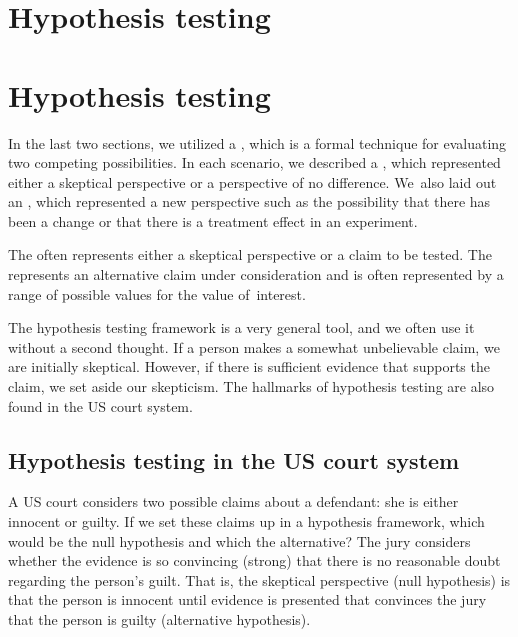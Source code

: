 \section{Hypothesis testing}

\section{Hypothesis testing}
\label{HypothesisTesting}

In the last two sections, we utilized a , which is a formal technique for evaluating two competing possibilities. In each scenario, we described a , which represented either a skeptical perspective or a perspective of no difference. We~also laid out an , which represented a new perspective such as the possibility that there has been a change or that there is a treatment effect in an experiment.

\begin{termBox}{
The  often represents either a skeptical perspective or a claim to be tested. The  represents an alternative claim under consideration and is often represented by a range of possible values for the value of~interest.}
\end{termBox}

The hypothesis testing framework is a very general tool, and we often use it without a second thought. If a person makes a somewhat unbelievable claim, we are initially skeptical. However, if there is sufficient evidence that supports the claim, we set aside our skepticism. The hallmarks of hypothesis testing are also found in the US court system. 

\subsection{Hypothesis testing in the US court system}

\begin{example}{A US court considers two possible claims about a defendant: she is either innocent or guilty. If we set these claims up in a hypothesis framework, which would be the null hypothesis and which the alternative?}\label{hypTestCourtExample}
The jury considers whether the evidence is so convincing (strong) that there is no reasonable doubt regarding the person's guilt. That is, the skeptical perspective (null hypothesis) is that the person is innocent until evidence is presented that convinces the jury that the person is guilty (alternative hypothesis).
\end{example}

